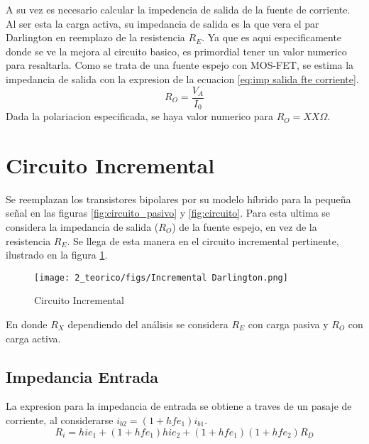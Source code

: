 A su vez es necesario calcular la impedencia de salida de la fuente de corriente. Al ser esta la carga activa, su impedancia de salida es la que vera el par Darlington en reemplazo de la resistencia $R_E$.
Ya que es aqui especificamente donde se ve la mejora al circuito basico, es primordial tener un valor numerico para resaltarla. Como se trata de una fuente espejo con MOS-FET, se estima la impedancia de salida con la expresion de la ecuacion \ref{eq:imp salida fte corriente}.
\begin{equation}
    R_O = \frac{V_A}{I_0} 
    \label{eq:imp salida fte corriente}
\end{equation}
Dada la polariacion especificada, se haya valor numerico para $R_O =XX \Omega$.

\section{Circuito Incremental}

Se reemplazan los transistores bipolares por su modelo híbrido para la pequeña señal en las figuras \ref{fig:circuito_pasivo} y \ref{fig:circuito}. Para esta ultima se considera la impedancia de salida ($R_O$) de la fuente espejo, en vez de la resistencia $R_E$.
Se llega de esta manera en el circuito incremental pertinente, ilustrado en la figura \ref{fig:circuito incremental darlington}.

\begin{figure}[ht]
    \centering
    \texttt{[image: 2\_teorico/figs/Incremental Darlington.png]}
    \caption{Circuito Incremental}
    \label{fig:circuito incremental darlington}
\end{figure}
En donde $R_X$ dependiendo del análisis se considera $R_E$ con carga pasiva y $R_O$ con carga activa. 


\subsection{Impedancia Entrada}

La expresion para la impedancia de entrada se obtiene a traves de un pasaje de corriente, al considerarse $i_{b2} = (1+hfe_1)i_{b1}$.
\begin{equation}
    R_i = hie_1 + (1+hfe_1)hie_2 + (1+hfe_1)(1+hfe_2)R_D
    \label{eq:Impedancia de entrada}
\end{equation}

